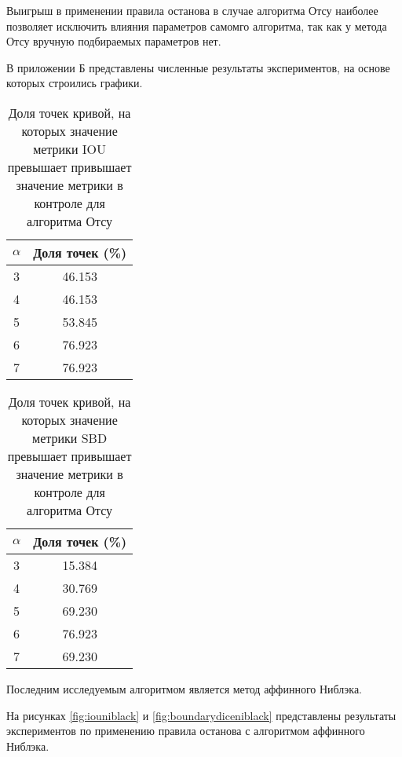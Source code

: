 Выигрыш в применении правила останова в случае алгоритма Отсу наиболее позволяет исключить влияния параметров самомго алгоритма, так как у метода Отсу вручную подбираемых параметров нет.

В приложении Б представлены численные результаты экспериментов, на основе которых строились графики.

 


\begin{table}[H]
\centering
\caption{Доля точек кривой, на которых значение метрики IOU превышает привышает значение метрики в  контроле для алгоритма Отсу}
\label{tab:otsuiou}
\begin{tabular}{|c|c|}
\hline
\(\alpha\) & Доля точек (\%) \\
\hline
3 & 46.153 \\
4 & 46.153 \\
5 & 53.845 \\
6 & 76.923 \\
7 & 76.923 \\
\hline
\end{tabular}
\end{table}

\begin{table}[H]
\centering
\caption{Доля точек кривой, на которых значение метрики SBD превышает привышает значение метрики в  контроле для алгоритма Отсу}
\label{tab:otsusbd}
\begin{tabular}{|c|c|}
\hline
\(\alpha\) & Доля точек (\%) \\
\hline
3 & 15.384 \\
4 & 30.769 \\
5 & 69.230 \\
6 & 76.923 \\
7 & 69.230 \\
\hline
\end{tabular}
\end{table}

Последним исследуемым алгоритмом является метод аффинного Ниблэка.

На рисунках \ref*{fig:iouniblack} и \ref*{fig:boundarydiceniblack} представлены результаты экспериментов по применению правила останова с алгоритмом аффинного Ниблэка.

